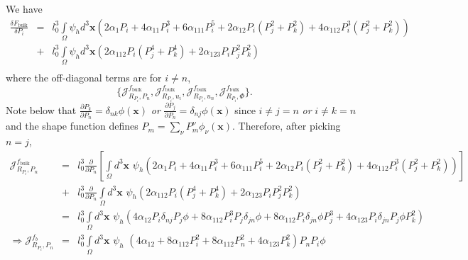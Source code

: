 \documentclass[16pt]{article} %
\begin{document}
%
We have 
%
\begin{eqnarray}
\frac{\delta F_\mathrm{bulk}}{\delta P_i} &=& l_0^3\int\limits_\Omega \psi_h d^3 {\boldsymbol x} \left(2 \alpha_1 P_i + 4 \alpha_{11} P_i^3 + 6 \alpha_{111} P_i^5 + 2 \alpha_{12} P_i \left(P_j^2 + P_k^2 \right) + 4 \alpha_{112} P_i^3 \left(P_j^2 + P_k^2 \right)  \right)\\ \nonumber
&+& l_0^3 \int\limits_\Omega \psi_h d^3 {\boldsymbol x} \left(2 \alpha_{112} P_i \left(P_j^4 + P_k^4 \right) + 2 \alpha_{123} P_i P_j^2 P_k^2  \right) \\ \nonumber
\end{eqnarray}
%
where the off-diagonal terms are for $i \neq n$,
%
\Large
$$\{ \mathscr{J}_{R_{P_i}, P_n}^{f_\mathrm{bulk}}, \mathscr{J}_{R_{P_i}, u_i}^{f_\mathrm{bulk}}, \mathscr{J}_{R_{P_i}, u_n}^{f_\mathrm{bulk}}, \mathscr{J}_{R_{P_i}, \Phi}^{f_\mathrm{bulk}} \}.$$
\normalsize
%
Note below that $\frac{\partial P_k}{\partial P_n} = \delta_{nk} \phi ({\boldsymbol x})$ \textit{or} $\frac{\partial P_j}{\partial P_n} = \delta_{nj} \phi ({\boldsymbol x})$ since $i \neq j =n$ \textit{or} $i \neq k = n$ and the shape function defines $P_m = \sum_\nu P_m^\nu \phi_\nu ({\boldsymbol x})$.
%
%
Therefore, after picking $n = j$, 
%
\begin{eqnarray}\nonumber
\mathscr{J}_{R_{P_i}, P_n}^{f_\mathrm{bulk}} &=&l_0^3  \frac{\partial }{\partial P_n} \left[\int\limits_\Omega d^3   {\boldsymbol x}\,\,\psi_h \left(2 \alpha_1 P_i + 4 \alpha_{11} P_i^3 + 6 \alpha_{111} P_i^5 + 2 \alpha_{12} P_i \left(P_j^2 + P_k^2 \right) + 4 \alpha_{112} P_i^3 \left(P_j^2 + P_k^2 \right)  \right) \right]\\ \nonumber
&+&l_0^3 \frac{\partial}{\partial P_n}  \int\limits_\Omega d^3 {\boldsymbol x}\,\,\psi_h  \left(2 \alpha_{112} P_i \left(P_j^4 + P_k^4 \right) + 2 \alpha_{123} P_i P_j^2 P_k^2  \right)\\ \nonumber
&=& l_0^3 \int\limits_\Omega d^3 {\boldsymbol x}\,\, \psi_h \left(4 \alpha_{12} P_i \delta_{nj} P_j \phi  + 8 \alpha_{112} P_i^3 P_j \delta_{jn} \phi + 8 \alpha_{112} P_i \delta_{jn} \phi P_j^3 + 4 \alpha_{123} P_i \delta_{jn} P_j \phi P_k^2\right)\\ \nonumber
\Rightarrow \mathscr{J}_{R_{P_i}, P_n}^{f_b} &=& l_0^3 \int\limits_\Omega d^3 {\boldsymbol x}\,\, \psi_h \,\, \left( 4 \alpha_{12} + 8 \alpha_{112} P_i^2 + 8 \alpha_{112} P_n^2 + 4 \alpha_{123} P_k^2\right) P_n P_i \phi \\ \nonumber
\end{eqnarray}
\end{document}
